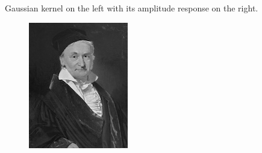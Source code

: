 \documentclass[]{article}
\begin{document}
\begin{figure}
\begin{subfigure}[t]{0.49\textwidth}
    \end{subfigure}
    \caption{Gaussian kernel on the left with its amplitude response on the
    right.}
    \label{fig:gaussian-kernel}
\end{figure}

\begin{figure}
  \centering
    \begin{subfigure}[t]{0.49\textwidth}
      \centering
      \includegraphics[width=0.99\linewidth]{input.png}
    \end{subfigure}
    \begin{subfigure}[t]{0.49\textwidth}
      \centering

\end{subfigure}
\end{figure}
\end{document}
